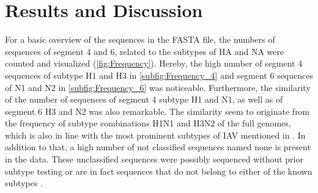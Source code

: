 \chapter{Results and Discussion} \label{chap:Results_and_Discussion}

For a basic overview of the sequences in the FASTA file, the numbers of sequences of segment 4 and 6, related to the subtypes of \gls{HA} and \gls{NA} were counted and visualized (\autoref{fig:Frequency}). Hereby, the high number of segment 4 sequences of subtype H1 and H3 in \autoref{subfig:Frequency_4} and segment 6 sequences of N1 and N2 in \autoref{subfig:Frequency_6} was noticeable. Furthermore, the similarity of the number of sequences of segment 4 subtype H1 and N1, as well as of segment 6 H3 and N2 was also remarkable. The similarity seem to originate from the frequency of subtype combinations H1N1 and H3N2 of the full genomes, which is also in line with the most prominent subtypes of \gls{IAV} mentioned in \textcite{deng_simplified_2015}. In addition to that, a high number of not classified sequences named \glqq none\grqq{} is present in the data. These unclassified sequences were possibly sequenced without prior subtype testing or are in fact sequences that do not belong to either of the known subtypes \autocite{noauthor_revision_1980}.

